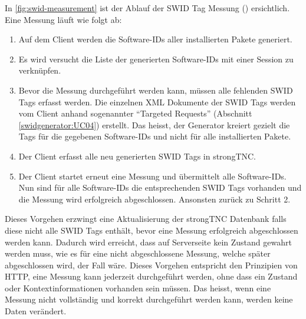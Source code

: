 In \autoref{fig:swid-measurement} ist der Ablauf der SWID Tag Messung
() ersichtlich. Eine Messung läuft wie folgt ab:

\begin{enumerate}
	\item Auf dem Client werden die Software-IDs aller installierten Pakete generiert. 
	
	\item Es wird versucht die Liste der generierten Software-IDs mit einer Session
	zu verknüpfen.
		
	\item Bevor die Messung durchgeführt werden kann, müssen alle fehlenden SWID
	Tags erfasst werden. Die einzelnen XML Dokumente der SWID Tags werden vom
	Client anhand sogenannter \enquote{Targeted Requests} (Abschnitt
	\ref{swidgenerator:UC04}) erstellt. Das heisst, der Generator kreiert gezielt
	die Tags für die gegebenen Software-IDs und nicht für alle installierten
	Pakete.
	
	\item Der Client erfasst alle neu generierten SWID Tags in strongTNC.
	
	\item Der Client startet erneut eine Messung und übermittelt alle Software-IDs.
	Nun sind für alle Software-IDs die entsprechenden SWID Tags vorhanden und die
	Messung wird erfolgreich abgeschlossen. Ansonsten zurück zu Schritt 2.
\end{enumerate}

Dieses Vorgehen erzwingt eine Aktualisierung der strongTNC Datenbank falls diese
nicht alle SWID Tags enthält, bevor eine Messung erfolgreich abgeschlossen
werden kann. Dadurch wird erreicht, dass auf Serverseite kein Zustand gewahrt
werden muss, wie es für eine nicht abgeschlossene Messung, welche später
abgeschlossen wird, der Fall wäre. Dieses Vorgehen entspricht den Prinzipien von
HTTP, eine Messung kann jederzeit durchgeführt werden, ohne dass ein Zustand
oder Kontextinformationen vorhanden sein müssen. Das heisst, wenn eine Messung
nicht vollständig und korrekt durchgeführt werden kann, werden keine Daten
verändert.

